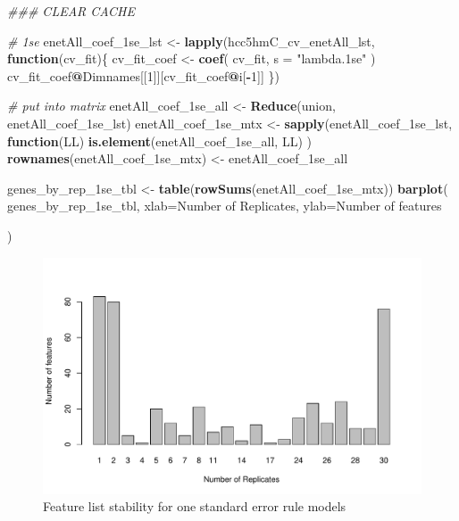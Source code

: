 \documentclass[
]{book}
\newenvironment{Shaded}{\begin{snugshade}}{\end{snugshade}}
\newcommand{\CommentTok}[1]{\textcolor[rgb]{0.56,0.35,0.01}{\textit{#1}}}
\newcommand{\ControlFlowTok}[1]{\textcolor[rgb]{0.13,0.29,0.53}{\textbf{#1}}}
\newcommand{\DataTypeTok}[1]{\textcolor[rgb]{0.13,0.29,0.53}{#1}}
\newcommand{\DecValTok}[1]{\textcolor[rgb]{0.00,0.00,0.81}{#1}}
\newcommand{\KeywordTok}[1]{\textcolor[rgb]{0.13,0.29,0.53}{\textbf{#1}}}
\newcommand{\NormalTok}[1]{#1}
\newcommand{\OperatorTok}[1]{\textcolor[rgb]{0.81,0.36,0.00}{\textbf{#1}}}
\newcommand{\StringTok}[1]{\textcolor[rgb]{0.31,0.60,0.02}{#1}}
\begin{document}
\begin{Shaded}
\begin{Highlighting}[]
\CommentTok{\#\#\# CLEAR CACHE}


\CommentTok{\# 1se}
\NormalTok{enetAll\_coef\_1se\_lst <{-}}\StringTok{ }\KeywordTok{lapply}\NormalTok{(hcc5hmC\_cv\_enetAll\_lst, }\ControlFlowTok{function}\NormalTok{(cv\_fit)\{}
\NormalTok{ cv\_fit\_coef <{-}}\StringTok{ }\KeywordTok{coef}\NormalTok{(}
\NormalTok{ cv\_fit,}
 \DataTypeTok{s =} \StringTok{"lambda.1se"}
\NormalTok{ )}
\NormalTok{ cv\_fit\_coef}\OperatorTok{@}\NormalTok{Dimnames[[}\DecValTok{1}\NormalTok{]][cv\_fit\_coef}\OperatorTok{@}\NormalTok{i[}\OperatorTok{{-}}\DecValTok{1}\NormalTok{]]}
\NormalTok{ \})}

\CommentTok{\# put into matrix}
\NormalTok{enetAll\_coef\_1se\_all <{-}}\StringTok{ }\KeywordTok{Reduce}\NormalTok{(union, enetAll\_coef\_1se\_lst)}
\NormalTok{enetAll\_coef\_1se\_mtx <{-}}\StringTok{ }\KeywordTok{sapply}\NormalTok{(enetAll\_coef\_1se\_lst, }
  \ControlFlowTok{function}\NormalTok{(LL) }\KeywordTok{is.element}\NormalTok{(enetAll\_coef\_1se\_all, LL)}
\NormalTok{)}
\KeywordTok{rownames}\NormalTok{(enetAll\_coef\_1se\_mtx) <{-}}\StringTok{ }\NormalTok{enetAll\_coef\_1se\_all}

\NormalTok{genes\_by\_rep\_1se\_tbl <{-}}\StringTok{ }\KeywordTok{table}\NormalTok{(}\KeywordTok{rowSums}\NormalTok{(enetAll\_coef\_1se\_mtx))}
\KeywordTok{barplot}\NormalTok{(}
\NormalTok{ genes\_by\_rep\_1se\_tbl,}
 \DataTypeTok{xlab=}\StringTok{\textquotesingle{}Number of Replicates\textquotesingle{}}\NormalTok{,}
 \DataTypeTok{ylab=}\StringTok{\textquotesingle{}Number of features\textquotesingle{}}

\NormalTok{)}
\end{Highlighting}
\end{Shaded}

\begin{figure}
\centering
\includegraphics{Static/figures/hcc5hmC-glmnetSuiteB-enet-feature-list-1se-1.pdf}
\caption{\label{fig:hcc5hmC-glmnetSuiteB-enet-feature-list-1se}Feature list stability for one standard error rule models}
\end{figure}
\end{document}
